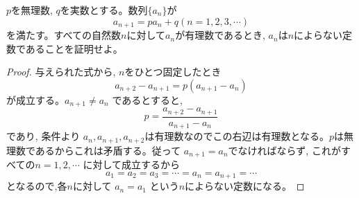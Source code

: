 $p$を無理数, $q$を実数とする。数列$\{a_n\}$が
\[a_{n+1}=pa_n+q　　(n=1,2,3,\cdots)\]
を満たす。すべての自然数$n$に対して$a_n$が有理数であるとき, $a_n$は$n$によらない定数であることを証明せよ。
\enthm
\begin{proof}
与えられた式から, $n$をひとつ固定したとき
\[ a_{n+2}-a_{n+1}=p(a_{n+1}-a_n) \]
が成立する。$a_{n+1}\neq a_n$ であるとすると, 
\[p=\dfrac{a_{n+2}-a_{n+1}}{a_{n+1}-a_{n}}\]
であり, 条件より $a_n, a_{n+1}, a_{n+2}$は有理数なのでこの右辺は有理数となる。$p$は無理数であるからこれは矛盾する。従って $a_{n+1}=a_n$でなければならず, これがすべての$n=1,2,\cdots$ に対して成立するから
\[a_1=a_2=a_3=\cdots =a_n=a_{n+1}=\cdots \]
となるので,各$n$に対して $a_n=a_1$ という$n$によらない定数になる。
\end{proof}
